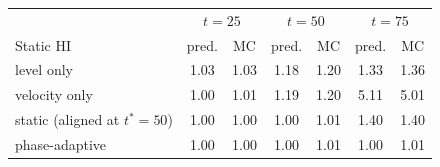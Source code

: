 \begin{tabular}{l c c c c c c }
\hline
 & \multicolumn{2}{c}{$t=25$} & \multicolumn{2}{c}{$t=50$} & \multicolumn{2}{c}{$t=75$} \\
Static HI & pred. & MC & pred. & MC & pred. & MC \\
\hline
level only & 1.03 & 1.03 & 1.18 & 1.20 & 1.33 & 1.36 \\
velocity only & 1.00 & 1.01 & 1.19 & 1.20 & 5.11 & 5.01 \\
static (aligned at $t^\ast=50$) & 1.00 & 1.00 & 1.00 & 1.01 & 1.40 & 1.40 \\
phase-adaptive & 1.00 & 1.00 & 1.00 & 1.01 & 1.00 & 1.01 \\
\hline
\end{tabular}

